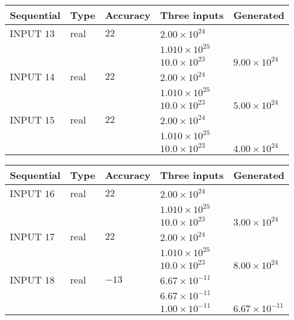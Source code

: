 \documentclass[12pt]{article}
\begin{document}
   
  
  
\noindent\begin{tabular}{|l|l|l|l|l|}
\hline
 Sequential & Type & Accuracy & Three inputs & Generated \\ 
\hline
 
 
  INPUT $          13$ & real & $          22 $ & $
 2.00 \times 10^{24}
  $ & \\
  & & &  $
 1.010 \times 10^{25}
  $ & \\
  & & &  $
 10.0 \times 10^{23}
 $ & $ 9.00 \times 10^{24} $ 
 \\  \hline  
 
 
  INPUT $          14$ & real & $          22 $ & $
 2.00 \times 10^{24}
  $ & \\
  & & &  $
 1.010 \times 10^{25}
  $ & \\
  & & &  $
 10.0 \times 10^{23}
 $ & $ 5.00 \times 10^{24} $ 
 \\  \hline  
 
 
  INPUT $          15$ & real & $          22 $ & $
 2.00 \times 10^{24}
  $ & \\
  & & &  $
 1.010 \times 10^{25}
  $ & \\
  & & &  $
 10.0 \times 10^{23}
 $ & $ 4.00 \times 10^{24} $ 
 \\  \hline  
 \end{tabular}
   
   
  
  
\noindent\begin{tabular}{|l|l|l|l|l|}
\hline
 Sequential & Type & Accuracy & Three inputs & Generated \\ 
\hline
 
 
  INPUT $          16$ & real & $          22 $ & $
 2.00 \times 10^{24}
  $ & \\
  & & &  $
 1.010 \times 10^{25}
  $ & \\
  & & &  $
 10.0 \times 10^{23}
 $ & $ 3.00 \times 10^{24} $ 
 \\  \hline  
 
 
  INPUT $          17$ & real & $          22 $ & $
 2.00 \times 10^{24}
  $ & \\
  & & &  $
 1.010 \times 10^{25}
  $ & \\
  & & &  $
 10.0 \times 10^{23}
 $ & $ 8.00 \times 10^{24} $ 
 \\  \hline  
 
 
  INPUT $          18$ & real & $         -13 $ & $
 6.67 \times 10^{-11}
  $ & \\
  & & &  $
 6.67 \times 10^{-11}
  $ & \\
  & & &  $
 1.00 \times 10^{-11}
 $ & $ 6.67 \times 10^{-11} $ 
 \\  \hline  
 \end{tabular}
   
\end{document}
